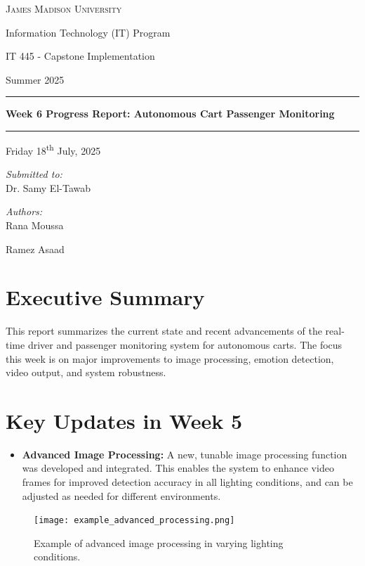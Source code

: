 \documentclass[12pt]{article}
\begin{document}
{
\begin{titlepage}
    \centering
    \vspace{1cm}
    {\Large\scshape James Madison University \par}
    \vspace{0.5cm}
    {\large Information Technology (IT) Program \par}
    {\large IT 445 - Capstone Implementation \par}
    {\large Summer 2025 \par}
    \vspace{1cm}
    \rule{\textwidth}{0.5pt}
    \vspace{0.5cm}
    {\bfseries\LARGE Week 6 Progress Report: Autonomous Cart Passenger Monitoring\par}
    \vspace{0.5cm}
    \rule{\textwidth}{0.5pt}
    \vspace{0.8cm}
    {\large Friday 18\textsuperscript{th} July, 2025 \par}
    \vspace{0.5cm}
    \begin{minipage}{0.3\textwidth}
        \raggedright
        \textit{Submitted to:}\\
        Dr. Samy El-Tawab
    \end{minipage}
    \begin{minipage}{0.45\textwidth}
        \raggedleft
        \textit{Authors:}\\
        Rana Moussa \par Ramez Asaad
    \end{minipage}
    \vfill
\end{titlepage}
\restoregeometry}

\section{Executive Summary}
This report summarizes the current state and recent advancements of the real-time driver and passenger monitoring system for autonomous carts. The focus this week is on major improvements to image processing, emotion detection, video output, and system robustness.

\section{Key Updates in Week 5}
\begin{itemize}
    \item \textbf{Advanced Image Processing:} A new, tunable image processing function was developed and integrated. This enables the system to enhance video frames for improved detection accuracy in all lighting conditions, and can be adjusted as needed for different environments.
\end{itemize}
\begin{figure}[h!]
    \centering
    \texttt{[image: example\_advanced\_processing.png]}
    \caption{Example of advanced image processing in varying lighting conditions.}
\end{figure}
\end{document}
